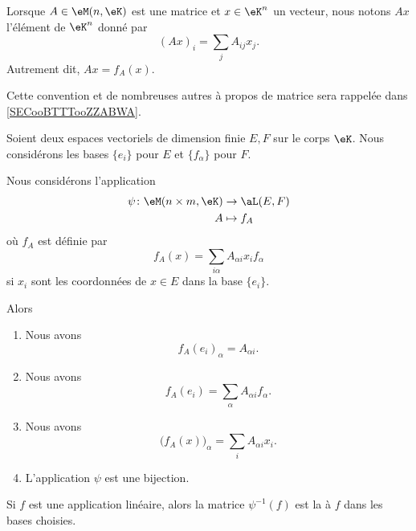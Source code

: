 \begin{normaltext}
    Lorsque \( A\in \eM(n,\eK)\) est une matrice et \( x\in \eK^n\) un vecteur, nous notons \( Ax\) l'élément de \( \eK^n\) donné par
    \begin{equation}        \label{EQooQFVTooMFfzol}
        (Ax)_i=\sum_jA_{ij}x_j.
    \end{equation}
    Autrement dit, \( Ax=f_A(x)\).

    Cette convention et de nombreuses autres à propos de matrice sera rappelée dans \ref{SECooBTTTooZZABWA}.
\end{normaltext}

\begin{propositionDef}      \label{PROPooGXDBooHfKRrv}
    Soient deux espaces vectoriels de dimension finie \( E,F\) sur le corps \( \eK\). Nous considérons les bases \( \{ e_i \}\) pour \( E\) et \( \{ f_{\alpha} \}\) pour \( F\). 

    Nous considérons l'application
    \begin{equation}
        \begin{aligned}
            \psi\colon \eM(n\times m, \eK)&\to \aL(E,F) \\
            A&\mapsto f_A 
        \end{aligned}
    \end{equation}
    où \( f_A\) est définie par
    \begin{equation}        \label{EQooZKEKooNYjvhP}
        f_A(x)=\sum_{i\alpha}A_{\alpha i}x_if_{\alpha}
    \end{equation}
    si \( x_i\) sont les coordonnées de \( x\in E\) dans la base \( \{ e_i \}\).

    Alors
    \begin{enumerate}
        \item       \label{ITEMooKZYYooZPTkpq}
            Nous avons
            \begin{equation}
                f_A(e_i)_{\alpha}=A_{\alpha i}.
            \end{equation}
        \item       \label{ITEMooANXFooGIuxUR}
            Nous avons
            \begin{equation}                \label{EQooOKOJooYgteNP}
                f_A(e_i)=\sum_{\alpha}A_{\alpha i}f_{\alpha}.
            \end{equation}
        \item       \label{ITEMooXLLLooKfigfB}
            Nous avons
            \begin{equation}        \label{EQooAXRJooUwHbjB}
                \big( f_A(x) \big)_{\alpha}=\sum_{i}A_{\alpha i}x_i.
            \end{equation}
        \item       \label{ITEMooHSMLooRJZref}
            L'application \( \psi\) est une bijection.
    \end{enumerate}
    Si \( f\) est une application linéaire, alors la matrice \( \psi^{-1}(f)\) est la  à \( f\) dans les bases choisies.
\end{propositionDef}

